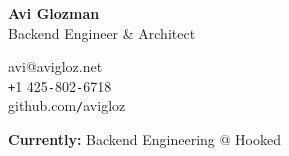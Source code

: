 \documentclass[10pt,oneside,final]{article}
\begin{document}
	\pagestyle{empty}	
	\begin{flushleft}	
		{\huge \textbf{Avi Glozman}}\\
		{\large Backend Engineer \& Architect\\}
		\vspace{2mm}
		\begin{leftli}
			{\large avi@avigloz.net}\\
			\vspace{0.2cm}
			{\large \texttt{+}1 425\texttt{-}802\texttt{-}6718}\\
			\vspace{0.2cm}
			{\large github.com\texttt{/}avigloz }
		\end{leftli}
		\vspace{-2.7cm}
		\begin{flushright}
		\end{flushright}    
		\vfill
		{\footnotesize \textbf{Currently:} Backend Engineering @ Hooked}
	\end{flushleft}
\end{document}
